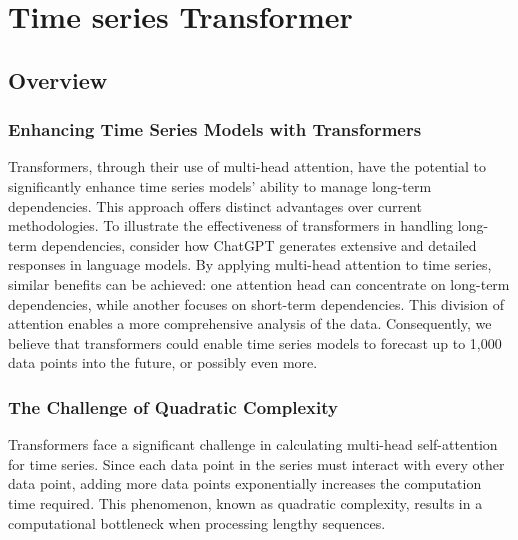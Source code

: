 \chapter{Time series Transformer}
\pagestyle{esitscCD}

\section{Overview}

\subsection{Enhancing Time Series Models with Transformers}

Transformers, through their use of multi-head attention, have the potential to significantly enhance time series models' ability to manage long-term dependencies. This approach offers distinct advantages over current methodologies. To illustrate the effectiveness of transformers in handling long-term dependencies, consider how ChatGPT generates extensive and detailed responses in language models. By applying multi-head attention to time series, similar benefits can be achieved: one attention head can concentrate on long-term dependencies, while another focuses on short-term dependencies. This division of attention enables a more comprehensive analysis of the data. Consequently, we believe that transformers could enable time series models to forecast up to 1,000 data points into the future, or possibly even more.

\subsection{The Challenge of Quadratic Complexity}

Transformers face a significant challenge in calculating multi-head self-attention for time series. Since each data point in the series must interact with every other data point, adding more data points exponentially increases the computation time required. This phenomenon, known as quadratic complexity, results in a computational bottleneck when processing lengthy sequences.


